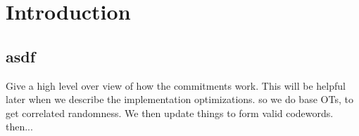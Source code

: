 \section{Introduction}




\subsection{asdf}

Give a high level over view of how the commitments work. This will be helpful later when we describe the implementation optimizations. so we do base OTs, to get correlated randomness. We then update things to form valid codewords. then...